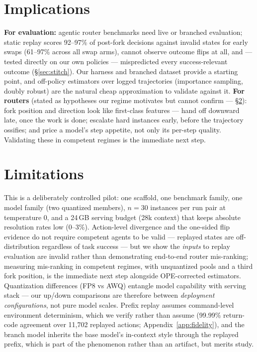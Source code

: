 \documentclass{article}
\begin{document}
\section{Implications}\label{sec:implications}

\textbf{For evaluation:} agentic router benchmarks need live or branched evaluation; static replay scores 92--97\% of post-fork decisions against invalid states for early swaps (61--97\% across all swap arms), cannot observe outcome flips at all, and --- tested directly on our own policies --- mispredicted every success-relevant outcome (\S\ref{sec:stitch}). Our harness and branched dataset provide a starting point, and off-policy estimators over logged trajectories (importance sampling, doubly robust) are the natural cheap approximation to validate against it. \textbf{For routers} (stated as hypotheses our regime motivates but cannot confirm --- \S\ref{sec:limitations}): fork position and direction look like first-class features --- hand off downward late, once the work is done; escalate hard instances early, before the trajectory ossifies; and price a model's step appetite, not only its per-step quality. Validating these in competent regimes is the immediate next step.

\section{Limitations}\label{sec:limitations}

This is a deliberately controlled pilot: one scaffold, one benchmark family, one model family (two quantized members), $n{=}30$ instances per run pair at temperature 0, and a 24\,GB serving budget (28k context) that keeps absolute resolution rates low (0--3\%). Action-level divergence and the one-sided flip evidence do not require competent agents to be valid --- replayed states are off-distribution regardless of task success --- but we show the \emph{inputs} to replay evaluation are invalid rather than demonstrating end-to-end router mis-ranking; measuring mis-ranking in competent regimes, with unquantized pools and a third fork position, is the immediate next step alongside OPE-corrected estimators. Quantization differences (FP8 vs AWQ) entangle model capability with serving stack --- our up/down comparisons are therefore between \emph{deployment configurations}, not pure model scales. Prefix replay assumes command-level environment determinism, which we verify rather than assume (99.99\% return-code agreement over 11{,}702 replayed actions; Appendix~\ref{app:fidelity}), and the branch model inherits the base model's in-context style through the replayed prefix, which is part of the phenomenon rather than an artifact, but merits study.
\end{document}
